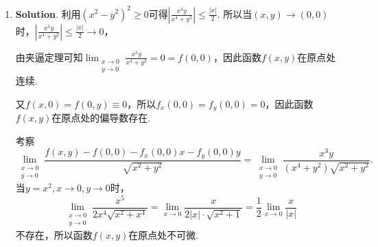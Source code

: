 \documentclass[../main.tex]{subfiles}
\begin{document}
\begin{enumerate}
          所以
          \[
              z(x,y) = x^{y}+x\int_{y}^{y+x}\mathrm{e}^{-u^2}\,\mathrm{d}u,
          \]
          \[
              \frac{\partial z}{\partial x}= yx^{y-1}+\int_{y}^{y+x}\mathrm{e}^{-u^2}\,\mathrm{d}
              u+x\cdot \mathrm{e}^{-(y+x)^2},
          \]
          \[
              \begin{aligned}
                  \frac{\partial^2 z}{\partial x \partial y}= {} & \frac{\partial}{\partial y}\left(yx^{y-1}+\int_{y}^{y+x}\mathrm{e}^{-u^2}\,\mathrm{d}u+x\cdot \mathrm{e}^{-(y+x)^2}\right) \\
                  = {}                                           & x^{y-1}+yx^{y-1}\ln x + \mathrm{e}^{-(y+x)^2}-\mathrm{e}^{-y^2}+x\cdot \mathrm{e}^{-(y+x)^2}\cdot (-2)(y+x)                \\
                  = {}                                           & x^{y-1}\left(1+y\ln x\right)+\mathrm{e}^{-(y+x)^2}\left(1-2x(y+x)\right)-\mathrm{e}^{-y^2}.
              \end{aligned}
          \]

          从而$\left.\frac{\partial^{2} z}{\partial x \partial y}\right|_{(1,0)}= -\frac{1}{\mathrm{e}}$.

    \item \textbf{Solution}. 利用$\left(x^{2}-y^{2}\right)^{2}\geq 0$可得$\left
              |\frac{x^{3} y}{x^{4} + y^{2}}\right| \leq \frac{|x|}{2}$. 所以当$(x,y)\to(
              0,0)$时，$\left|\frac{x^{3} y}{x^{4} + y^{2}}\right| \leq \frac{|x|}{2}\to0$，

          由夹逼定理可知$\lim_{\substack{x\to 0 \\ y\to 0}}\frac{x^{3} y}{x^{4} + y^{2}}
              =0=f(0,0)$，因此函数$f(x,y)$在原点处连续.

          又$f(x,0)=f(0,y)\equiv 0$，所以$f_{x}(0,0)=f_{y}(0,0)=0$，因此函数$f(x,y)$在原点处的偏导数存在.

          考察
          \[
              \lim_{\substack{x\to 0 \\ y\to 0}}\frac{f(x,y)-f(0,0)-f_{x}(0,0)x-f_{y}(0,0)y}{\sqrt{x^{2}+y^{2}}}
              = \lim_{\substack{x\to 0 \\ y\to 0}}\frac{x^{3} y}{\left(x^{4} + y^{2}\right)\sqrt{x^2+y^2}}.
          \]
          当$y=x^{2},x\to0,y\to0$时，
          \[
              \lim_{\substack{x\to 0 \\ y\to 0}}\frac{x^{5}}{2x^{4}\sqrt{x^2+x^4}}
              = \lim_{x\to0}\frac{x}{2|x|\cdot\sqrt{x^2+1}}= \frac{1}{2}\lim_{x\to0}\frac{x}{|x|}
          \]
          不存在，所以函数$f(x,y)$在原点处不可微.


\end{enumerate}
\end{document}
